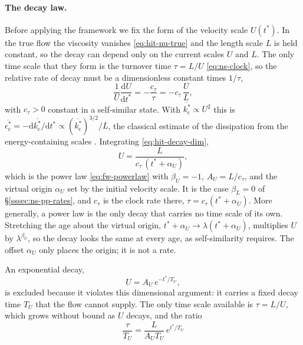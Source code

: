 \documentclass{article}
\begin{document}
\paragraph{The decay law.}
Before applying the framework we fix the form of the velocity scale $U(t^*)$.
In the true flow the viscosity vanishes \eqref{eq:hit-nu-true} and the
length scale $L$ is held constant, so the decay can depend only on the current
scales $U$ and $L$. The only time scale that they form is the turnover time
$\tau = L/U$ \eqref{eq:ns-clock}, so the relative rate of decay must be a
dimensionless constant times $1/\tau$,
\begin{equation}\label{eq:hit-decay-dim}
  \frac{1}{U}\frac{\mathrm{d} U}{\mathrm{d} t^*} = -\frac{c_\tau}{\tau}
  = -c_\tau\, \frac{U}{L} ,
\end{equation}
with $c_\tau > 0$ constant in a self-similar state. With
$\overline{k_{\mathrm{c}}^*} \propto U^2$ this is
$\overline{\epsilon_{\mathrm{c}}^*} = -\mathrm{d}\overline{k_{\mathrm{c}}^*}/\mathrm{d}t^*
\propto (\overline{k_{\mathrm{c}}^*})^{3/2}/L$, the classical estimate of the
dissipation from the energy-containing scales \cite{pope2000turbulent}.
Integrating \eqref{eq:hit-decay-dim},
\begin{equation}\label{eq:hit-decay-powerlaw}
  U = \frac{L}{c_\tau\, (t^* + \alpha_U)} ,
\end{equation}
which is the power law \eqref{eq:fw-powerlaw} with $\beta_U = -1$,
$A_U = L/c_\tau$, and the virtual origin $\alpha_U$ set by the initial
velocity scale. It is the case $\beta_L = 0$ of
\S\ref{sssec:ns-pp-rates}, and $c_\tau$ is the clock rate there,
$\tau = c_\tau (t^* + \alpha_U)$. More generally, a power law is the only
decay that carries no time scale of its own. Stretching the age about the
virtual origin, $t^* + \alpha_U \to \lambda (t^* + \alpha_U)$, multiplies $U$
by $\lambda^{\beta_U}$, so the decay looks the same at every age, as
self-similarity requires. The offset $\alpha_U$ only places the origin; it is
not a rate.
\par
An exponential decay,
\begin{equation}\label{eq:hit-decay-exp}
  U = A_U\, e^{-t^*/T_U} ,
\end{equation}
is excluded because it violates this dimensional argument: it carries a fixed
decay time $T_U$ that the flow cannot supply. The only time scale available
is $\tau = L/U$, which grows without bound as $U$ decays, and the ratio
\begin{equation}
  \frac{\tau}{T_U} = \frac{L}{A_U T_U}\, e^{t^*/T_U}
\end{equation}
\end{document}

